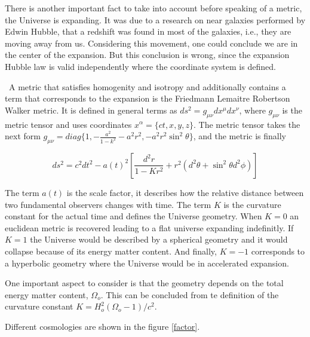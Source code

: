 There is another important fact to take into account before speaking of a metric,
the Universe is expanding. It was due to a research on near galaxies performed
by Edwin Hubble, that a redshift was found in most of the galaxies, i.e., they
are moving away from us. 
Considering this movement, one could conclude we are in the center of the 
expansion. But this conclusion is wrong, since the expansion Hubble law is
valid independently where the coordinate system is defined. 

\
A metric that satisfies homogenity and isotropy and additionally
contains a term that corresponds to the expansion is the 
Friedmann Lemaitre Robertson Walker metric. It is defined in 
general terms as $ds^2 = g_{\mu\nu}dx^{\mu}dx^{\nu}$, where $g_{\mu\nu}$
is the metric tensor and uses coordinates $x^{\alpha} = \{ct,x,y,z\}$.
The metric tensor takes the next form $ g_{\mu\nu} = diag\{1,-\frac{a^2}{1-k^2}
-a^2r^2,-a^2r^2\sin^2\theta\}$, and the metric is finally 

\begin{equation}
ds^2= c^2dt^2-a(t)^2\left[\frac{d^2r}{1-Kr^2} +r^2(d^2\theta
 + \sin^2\theta d^2\phi )\right]
\label{metric}
\end{equation} 	

The term $a(t)$ is the scale factor, it describes how the relative
distance between two fundamental observers changes with time. 
The term $K$ is the curvature constant for the actual time and defines
the Universe geometry. When $K=0$ an euclidean metric is recovered 
leading to a flat universe expanding indefinitly. If $K=1$ the Universe
would be described by a spherical geometry and it would collapse because
of its energy matter content. And finally, $K=-1$ corresponds to a
hyperbolic geometry where the Universe would be in accelerated expansion.  

One important aspect to consider is that the geometry depends on the 
total energy matter content, $\Omega_o$. This can be concluded from
te definition of the curvature constant $K = H_o^2(\Omega_o -1)/c^2$. 

Different cosmologies are shown in the figure \ref{factor}. 

